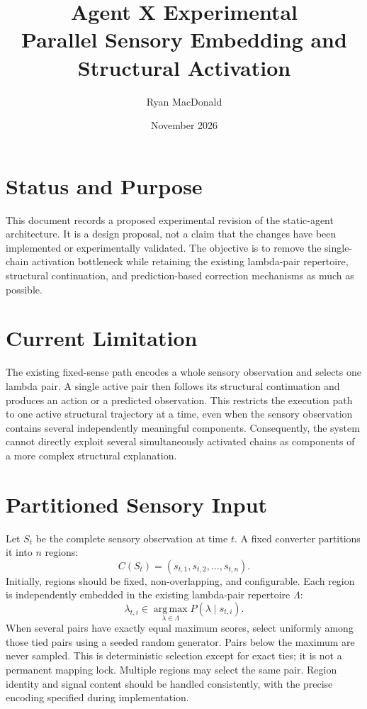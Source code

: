\documentclass[11pt]{article}
\title{Agent X Experimental\\\large Parallel Sensory Embedding and Structural Activation}
\author{Ryan MacDonald}
\date{November 2026}
\begin{document}
\maketitle

\section{Status and Purpose}
This document records a proposed experimental revision of the static-agent architecture. It is a design proposal, not a claim that the changes have been implemented or experimentally validated. The objective is to remove the single-chain activation bottleneck while retaining the existing lambda-pair repertoire, structural continuation, and prediction-based correction mechanisms as much as possible.

\section{Current Limitation}
The existing fixed-sense path encodes a whole sensory observation and selects one lambda pair. A single active pair then follows its structural continuation and produces an action or a predicted observation. This restricts the execution path to one active structural trajectory at a time, even when the sensory observation contains several independently meaningful components. Consequently, the system cannot directly exploit several simultaneously activated chains as components of a more complex structural explanation.

\section{Partitioned Sensory Input}
Let $S_t$ be the complete sensory observation at time $t$. A fixed converter partitions it into $n$ regions:
\[
C(S_t)=(s_{t,1},s_{t,2},\ldots,s_{t,n}).
\]
Initially, regions should be fixed, non-overlapping, and configurable. Each region is independently embedded in the existing lambda-pair repertoire $\Lambda$:
\[
\lambda_{t,i}\in\operatorname*{arg\,max}_{\lambda\in\Lambda}
P(\lambda\mid s_{t,i}).
\]
When several pairs have exactly equal maximum scores, select uniformly among those tied pairs using a seeded random generator. Pairs below the maximum are never sampled. This is deterministic selection except for exact ties; it is not a permanent mapping lock. Multiple regions may select the same pair. Region identity and signal content should be handled consistently, with the precise encoding specified during implementation.
\end{document}

